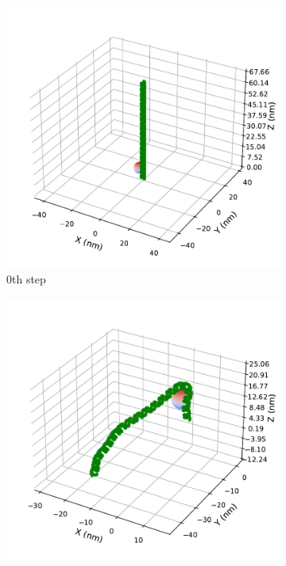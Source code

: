 \documentclass[a4paper,10pt]{article}
\begin{document}
\begin{figure}[htbp]
\centering
\begin{subfigure}{.49\textwidth}
\includegraphics[width=\textwidth]{hist_0.pdf}
\caption{0th step}
\label{fig:hist_a}
\end{subfigure}
\begin{subfigure}{.49\textwidth}
\includegraphics[width=\textwidth]{hist_100000.pdf}

\end{subfigure}
\end{figure}
\end{document}
